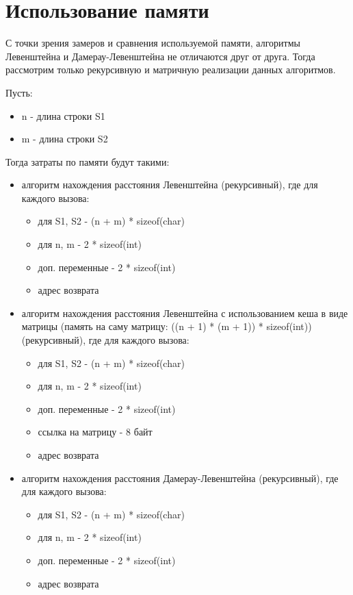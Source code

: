 \section{Использование памяти}

С точки зрения замеров и сравнения используемой памяти, алгоритмы Левенштейна и Дамерау-Левенштейна не отличаются друг от друга.
Тогда рассмотрим только рекурсивную и матричную реализации данных алгоритмов.

Пусть:
\begin{itemize}
    \item n - длина строки S1
    \item m - длина строки S2
\end{itemize}

Тогда затраты по памяти будут такими:
\begin{itemize}
    \item алгоритм нахождения расстояния Левенштейна (рекурсивный), где для каждого вызова:

    \begin{itemize}
        \item для S1, S2 - (n + m) * sizeof(char)
        \item для n, m - 2 * sizeof(int)
        \item доп. переменные - 2 * sizeof(int)
        \item адрес возврата
    \end{itemize}

    \item алгоритм нахождения расстояния Левенштейна с использованием кеша в виде матрицы (память на саму матрицу: ((n + 1) * (m + 1)) * sizeof(int)) (рекурсивный), где для каждого вызова:

    \begin{itemize}
        \item для S1, S2 - (n + m) * sizeof(char)
        \item для n, m - 2 * sizeof(int)
        \item доп. переменные - 2 * sizeof(int)
        \item ссылка на матрицу - 8 байт
        \item адрес возврата
    \end{itemize}

    \item алгоритм нахождения расстояния Дамерау-Левенштейна (рекурсивный), где для каждого вызова:

    \begin{itemize}
        \item для S1, S2 - (n + m) * sizeof(char)
        \item для n, m - 2 * sizeof(int)
        \item доп. переменные - 2 * sizeof(int)
        \item адрес возврата
    \end{itemize}



\end{itemize}
